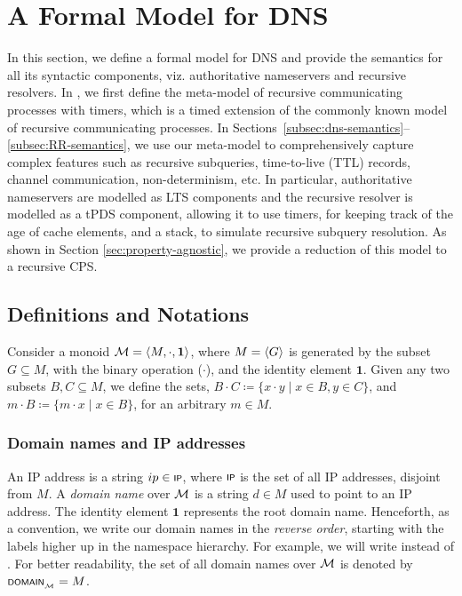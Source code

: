 \section{\label{formal-model} A Formal Model for DNS}

In this section, we define a formal model for DNS and provide the semantics
for all its syntactic components, viz. authoritative nameservers and
recursive resolvers. In , we first define the meta-model of recursive communicating processes with timers, which is a timed extension of the commonly known model of recursive communicating processes. In  Sections~\ref{subsec:dns-semantics}--\ref{subsec:RR-semantics},
we use our meta-model to comprehensively capture complex features such as recursive subqueries, time-to-live (TTL) records, channel communication, non-determinism, etc. In particular, authoritative nameservers are modelled as LTS components and the recursive resolver is modelled as a tPDS component, allowing it to use timers, for keeping track of the age of cache elements, and a stack, to simulate recursive subquery resolution. As shown in Section \ref{sec:property-agnostic}, we provide a reduction of this model to a recursive CPS.



\subsection{Definitions and Notations}\label{subsec:def-not}
Consider a monoid $\mathcal M = \langle M,\cdot, \mathbf{1} \rangle$, where $M = \langle G \rangle$ is generated by the subset $G \subseteq M$, with the binary operation ($\cdot$), and the identity element $\mathbf{1}$. Given any two subsets $B,C \subseteq M$, we define the sets, $B\cdot C \coloneqq \{x\cdot y\mid x\in B, y\in C\}$, and $m\cdot B \coloneqq \{m\cdot x \mid x\in B\}$, for an arbitrary $m \in M$.

\subsubsection{Domain names and IP addresses}
An IP address is a string $ip\in \scrsf{ip}$, where $\scrsf{ip}$ is the set of all IP addresses, disjoint from $M$. A \emph{domain name} over $\mathcal M$ is a string $d \in M$ used to point to an IP address. The identity element $\mathbf{1}$ represents the root domain name. Henceforth, as a convention, we write our domain names in the \emph{reverse order}, starting with the labels higher up in the namespace hierarchy. For example, we will write  instead of . For better readability, the set of all domain names over $\mathcal M$ is denoted by $\scrsf{domain}\subsub{\monoid} = M$.





